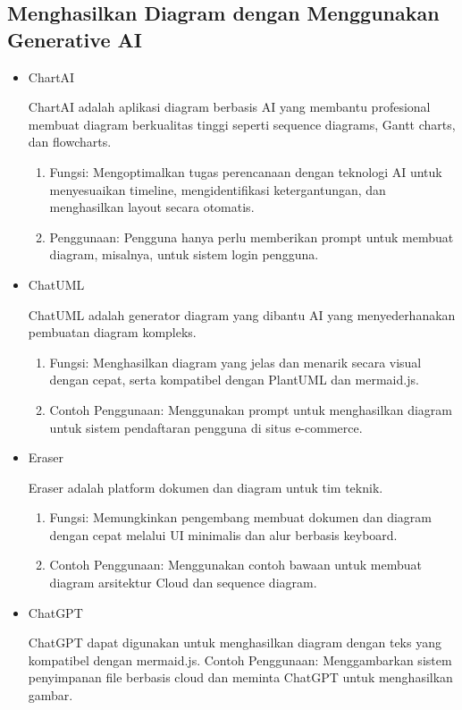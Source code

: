 \documentclass{article}
\begin{document}
\subsection{Menghasilkan Diagram dengan Menggunakan Generative AI}
\begin{itemize}
    \item ChartAI

          ChartAI adalah aplikasi diagram berbasis AI yang membantu profesional membuat diagram berkualitas tinggi seperti sequence diagrams, Gantt charts, dan flowcharts.
          \begin{enumerate}
              \item Fungsi: Mengoptimalkan tugas perencanaan dengan teknologi AI untuk menyesuaikan timeline, mengidentifikasi ketergantungan, dan menghasilkan layout secara otomatis.
              \item Penggunaan: Pengguna hanya perlu memberikan prompt untuk membuat diagram, misalnya, untuk sistem login pengguna.
          \end{enumerate}
    \item ChatUML

          ChatUML adalah generator diagram yang dibantu AI yang menyederhanakan pembuatan diagram kompleks.
          \begin{enumerate}
              \item Fungsi: Menghasilkan diagram yang jelas dan menarik secara visual dengan cepat, serta kompatibel dengan PlantUML dan mermaid.js.
              \item Contoh Penggunaan: Menggunakan prompt untuk menghasilkan diagram untuk sistem pendaftaran pengguna di situs e-commerce.
          \end{enumerate}
    \item Eraser

          Eraser adalah platform dokumen dan diagram untuk tim teknik.
          \begin{enumerate}
              \item Fungsi: Memungkinkan pengembang membuat dokumen dan diagram dengan cepat melalui UI minimalis dan alur berbasis keyboard.
              \item Contoh Penggunaan: Menggunakan contoh bawaan untuk membuat diagram arsitektur Cloud dan sequence diagram.
          \end{enumerate}
    \item ChatGPT

          ChatGPT dapat digunakan untuk menghasilkan diagram dengan teks yang kompatibel dengan mermaid.js. Contoh Penggunaan: Menggambarkan sistem penyimpanan file berbasis cloud dan meminta ChatGPT untuk menghasilkan gambar.
\end{itemize}
\end{document}
